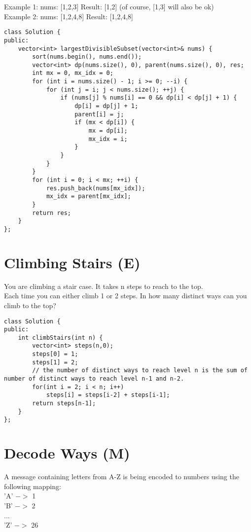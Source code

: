 Example 1:
nums: [1,2,3]
Result: [1,2] (of course, [1,3] will also be ok)\\

Example 2:
nums: [1,2,4,8]
Result: [1,2,4,8]\\

\begin{lstlisting}
class Solution {
public:
    vector<int> largestDivisibleSubset(vector<int>& nums) {
        sort(nums.begin(), nums.end());
        vector<int> dp(nums.size(), 0), parent(nums.size(), 0), res;
        int mx = 0, mx_idx = 0;
        for (int i = nums.size() - 1; i >= 0; --i) {
            for (int j = i; j < nums.size(); ++j) {
                if (nums[j] % nums[i] == 0 && dp[i] < dp[j] + 1) {
                    dp[i] = dp[j] + 1;
                    parent[i] = j;
                    if (mx < dp[i]) {
                        mx = dp[i];
                        mx_idx = i;
                    }
                }
            }
        }
        for (int i = 0; i < mx; ++i) {
            res.push_back(nums[mx_idx]);
            mx_idx = parent[mx_idx];
        }
        return res;
    }
};
\end{lstlisting}


\section{Climbing Stairs (E)}
You are climbing a stair case. It takes n steps to reach to the top.\\

Each time you can either climb 1 or 2 steps. In how many distinct ways can you climb to the top? \\ 

\begin{lstlisting}
class Solution {
public:
    int climbStairs(int n) {
        vector<int> steps(n,0);
        steps[0] = 1;
        steps[1] = 2;
        // the number of distinct ways to reach level n is the sum of number of distinct ways to reach level n-1 and n-2.
        for(int i = 2; i < n; i++)
            steps[i] = steps[i-2] + steps[i-1]; 
        return steps[n-1];
    }
};
\end{lstlisting}


\section{Decode Ways (M)}
 A message containing letters from A-Z is being encoded to numbers using the following mapping:\\
'A' $->$ 1\\
'B' $->$ 2\\
...\\
'Z' $->$ 26\\

